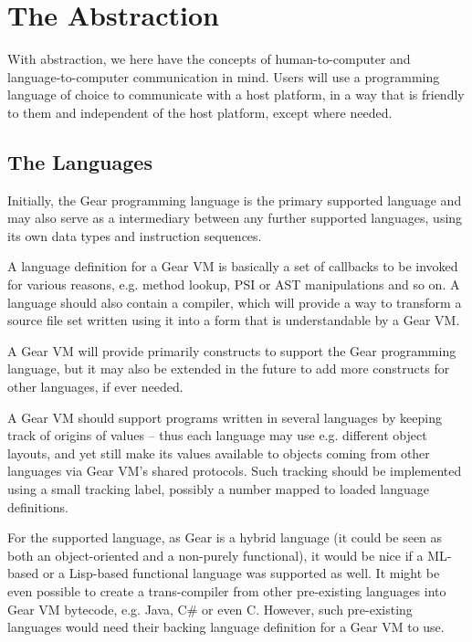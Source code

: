\chapter{The Abstraction}

With abstraction, we here have the concepts of human-to-computer and language-to-computer communication in mind. Users will use a programming language of choice to communicate with a host platform, in a way that is friendly to them and independent of the host platform, except where needed. 







\section{The Languages}

Initially, the Gear programming language is the primary supported language and may also serve as a intermediary between any further supported languages, using its own data types and instruction sequences. 

A language definition for a Gear VM is basically a set of callbacks to be invoked for various reasons, e.g. method lookup, PSI or AST manipulations and so on. A language should also contain a compiler, which will provide a way to transform a source file set written using it into a form that is understandable by a Gear VM. 

A Gear VM will provide primarily constructs to support the Gear programming language, but it may also be extended in the future to add more constructs for other languages, if ever needed. 

A Gear VM should support programs written in several languages by keeping track of origins of values -- thus each language may use e.g. different object layouts, and yet still make its values available to objects coming from other languages via Gear VM's shared protocols. Such tracking should be implemented using a small tracking label, possibly a number mapped to loaded language definitions. 

For the supported language, as Gear is a hybrid language (it could be seen as both an object-oriented and a non-purely functional), it would be nice if a ML-based or a Lisp-based functional language was supported as well. It might be even possible to create a trans-compiler from other pre-existing languages into Gear VM bytecode, e.g. Java, C\# or even C. However, such pre-existing languages would need their backing language definition for a Gear VM to use. 





